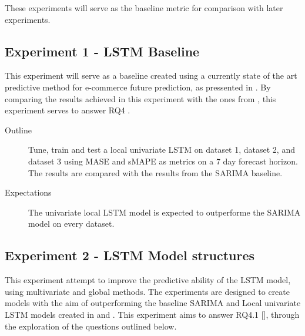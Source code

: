 These experiments will serve as the baseline metric for comparison with later experiments.




\subsection{Experiment 1 - LSTM Baseline}
\label{section:results:experimentPlan:Experiment-1}
This experiment will serve as a baseline created using a currently state of the art predictive method
for e-commerce future prediction, as pressented in .
By comparing the results achieved in this experiment with the ones from ,
this experiment serves to answer RQ4 .

\begin{description}
  \item[Outline]{
              Tune, train and test a local univariate LSTM on dataset 1,
              dataset 2, and dataset 3 using MASE and sMAPE as metrics on a 7 day forecast horizon.
              The results are compared with the results from the SARIMA baseline. }
\end{description}

\begin{description}
  \item[Expectations]{
              The univariate local LSTM model is expected to outperforme the SARIMA model on every dataset.
        }
\end{description}




\subsection{Experiment 2 - LSTM Model structures}
\label{section:results:experimentPlan:Experiment-2}
This experiment attempt to improve the predictive ability of the LSTM model,
using multivariate and global methods.
The experiments are designed to create models with the aim of outperforming the baseline
SARIMA and Local univariate LSTM models created in  and .
This experiment aims to answer RQ4.1 [],
through the exploration of the questions outlined below.

